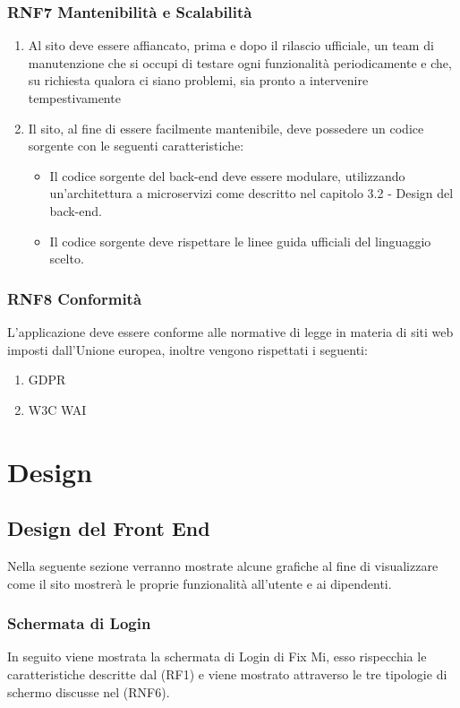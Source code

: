 \documentclass{report}
\begin{document}
\subsection*{RNF7 Mantenibilità e Scalabilità}
\begin{enumerate}
	\item Al sito deve essere affiancato, prima e dopo il rilascio ufficiale, un team di manutenzione che si occupi di testare ogni funzionalità periodicamente e che, su richiesta qualora ci siano problemi, sia pronto a intervenire tempestivamente
	\item Il sito, al fine di essere facilmente mantenibile, deve possedere un codice sorgente con le seguenti caratteristiche:
	\begin{itemize}
		\item Il codice sorgente del back-end deve essere modulare, utilizzando un'architettura a microservizi come descritto nel capitolo 3.2 - Design del back-end.
		\item Il codice sorgente deve rispettare le linee guida ufficiali del linguaggio scelto.
	
	\end{itemize} 
\end{enumerate}
\subsection*{RNF8 Conformità}
L'applicazione deve essere conforme alle normative di legge in materia di siti web imposti dall'Unione europea, inoltre vengono rispettati i seguenti:
\begin{enumerate}
	\item GDPR
	\item W3C WAI
\end{enumerate}
\chapter{Design}

\section{Design del Front End}

Nella seguente sezione verranno mostrate alcune grafiche al fine di visualizzare come il sito mostrerà le proprie funzionalità all’utente e ai dipendenti.

\subsection*{Schermata di Login}
In seguito viene mostrata la schermata di Login di Fix Mi, esso rispecchia le caratteristiche descritte dal (RF1) e viene mostrato attraverso le tre tipologie di schermo discusse nel (RNF6).
\end{document}
